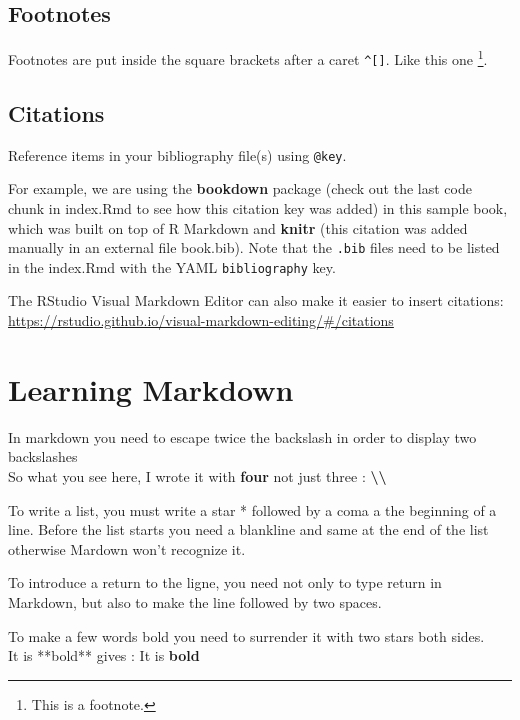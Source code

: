 \documentclass[
]{book}
\begin{document}
\hypertarget{footnotes}{%
\section{Footnotes}\label{footnotes}}

Footnotes are put inside the square brackets after a caret \texttt{\^{}{[}{]}}. Like this one \footnote{This is a footnote.}.

\hypertarget{citations}{%
\section{Citations}\label{citations}}

Reference items in your bibliography file(s) using \texttt{@key}.

For example, we are using the \textbf{bookdown} package \citep{R-bookdown} (check out the last code chunk in index.Rmd to see how this citation key was added) in this sample book, which was built on top of R Markdown and \textbf{knitr} \citep{xie2015} (this citation was added manually in an external file book.bib).
Note that the \texttt{.bib} files need to be listed in the index.Rmd with the YAML \texttt{bibliography} key.

The RStudio Visual Markdown Editor can also make it easier to insert citations: \url{https://rstudio.github.io/visual-markdown-editing/\#/citations}

\hypertarget{learning-markdown}{%
\chapter{Learning Markdown}\label{learning-markdown}}

In markdown you need to escape twice the backslash in order to display two backslashes\\
So what you see here, I wrote it with \textbf{four} not just three : \textbf{\textbackslash\textbackslash{}}

To write a list, you must write a star * followed by a coma a the beginning of a line.
Before the list starts you need a blankline and same at the end of the list otherwise Mardown won't recognize it.

To introduce a return to the ligne, you need not only to type return in Markdown, but also to make the line followed by two spaces.

To make a few words bold you need to surrender it with two stars both sides.\\
It is **bold** gives : It is \textbf{bold}
\end{document}
